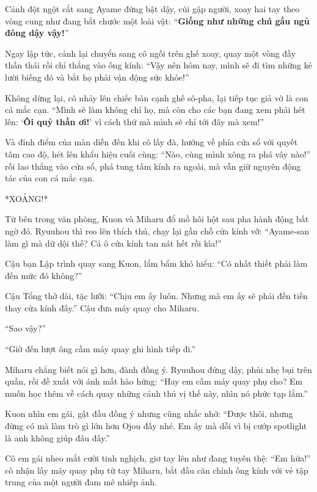 \documentclass[../main.tex]{subfiles}
\begin{document}
Cảnh đột ngột cắt sang Ayame đứng bật dậy, cúi gập người, xoay hai tay theo vòng cung như đang bắt chước một loài vật: ``\textbf{Giống như những chú gấu ngủ đông dậy vậy!}''


Ngay lập tức, cảnh lại chuyển sang cô ngồi trên ghế xoay, quay một vòng đầy thần thái rồi chỉ thẳng vào ống kính: ``Vậy nên hôm nay, mình sẽ đi tìm những kẻ lười biếng đó và bắt họ phải vận động sức khỏe!''


Không dừng lại, cô nhảy lên chiếc bàn cạnh ghế sô-pha, lại tiếp tục giả vờ là con cá mắc cạn. ``Mình sẽ làm không chỉ họ, mà còn cho các bạn đang xem phải hét lên: `\textbf{Ôi quỷ thần ơi!}' vì cách thứ mà mình sẽ chỉ tới đây mà xem!''


Và đỉnh điểm của màn diễn đến khi cô lấy đà, hướng về phía cửa sổ với quyết tâm cao độ, hét lên khẩu hiệu cuối cùng: ``Nào, cùng mình xông ra phá vây nào!'' rồi lao thẳng vào cửa sổ, phá tung tấm kính ra ngoài, mà vẫn giữ nguyên động tác của con cá mắc cạn.

*XOẢNG!*


Từ bên trong văn phòng, Kuon và Miharu đổ mồ hôi hột sau pha hành động bất ngờ đó. Ryuuhou thì reo lên thích thú, chạy lại gần chỗ cửa kính vỡ: ``Ayame-san làm gì mà dữ dội thế? Cả ô cửa kính tan nát hết rồi kìa!''

Cậu bạn Lập trình quay sang Kuon, lẩm bẩm khó hiểu: ``Có nhất thiết phải làm đến mức đó không?''

Cậu Tổng thở dài, tặc lưỡi: ``Chịu em ấy luôn. Nhưng mà em ấy sẽ phải đền tiền thay cửa kính đấy.'' Cậu đưa máy quay cho Miharu.

``Sao vậy?''

``Giờ đến lượt ông cầm máy quay ghi hình tiếp đi.''

Miharu chẳng biết nói gì hơn, đành đồng ý. Ryuuhou đứng dậy, phủi nhẹ bụi trên quần, rồi đề xuất với ánh mắt hào hứng: ``Hay em cầm máy quay phụ cho? Em muốn học thêm về cách quay những cảnh thú vị thế này, nhìn nó phức tạp lắm.''

Kuon nhìn em gái, gật đầu đồng ý nhưng cũng nhắc nhở: ``Được thôi, nhưng đừng có mà làm trò gì lớn hơn Ojou đấy nhé. Em ấy mà dỗi vì bị cướp spotlight là anh không giúp đâu đấy.''

Cô em gái nheo mắt cười tinh nghịch, giơ tay lên như đang tuyên thệ: ``Em hứa!'' cô nhận lấy máy quay phụ từ tay Miharu, bắt đầu căn chỉnh ống kính với vẻ tập trung của một người đam mê nhiếp ảnh.
\end{document}

